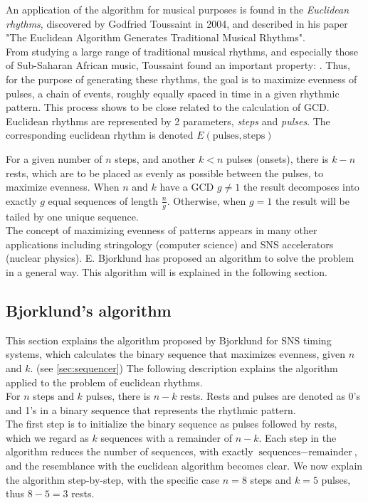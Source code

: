 An application of the algorithm for musical purposes is found in the \textit{Euclidean rhythms}, discovered by Godfried Toussaint in 2004, and described in his paper "The Euclidean Algorithm  Generates Traditional Musical Rhythms".\\
From studying a large range of traditional musical rhythms, and especially those of Sub-Saharan African music, Toussaint found an important property: \cite{Toussaint2005TheEA}. Thus, for the purpose of generating these rhythms, the goal is to maximize evenness of pulses, a chain of events, roughly equally spaced in time in a given rhythmic pattern.\cite{parncutt}
This process shows to be close related to the calculation of GCD.\\ 
Euclidean rhythms are represented by 2 parameters, \textit{steps} and \textit{pulses}. The corresponding euclidean rhythm is denoted $E(\text{pulses}, \text{steps})$

For a given number of $n$ steps, and another $k<n$ pulses (onsets), there is $k-n$ rests, which are to be placed as evenly as possible between the pulses, to maximize evenness. 
When $n$ and $k$ have a GCD $g \neq 1$ the result decomposes into exactly $g$ equal sequences of length $\frac{n}{g}$. Otherwise, when $g = 1$ the result will be tailed by one unique sequence.\\
The concept of maximizing evenness of patterns appears in many other applications including stringology (computer science) and SNS accelerators (nuclear physics)\cite{Toussaint2005TheEA}.
E. Bjorklund has proposed an algorithm to solve the problem in a general way\cite{bjorklund}\cite{Demaine2009TheDG}. This algorithm will is explained in the following section. 

\subsection{Bjorklund's algorithm}
\label{sec:bjorklund}
This section explains the algorithm proposed by Bjorklund for SNS timing systems, which calculates the binary sequence that maximizes evenness, given $n$ and $k$. (see \cref{sec:sequencer}) The following description explains the algorithm applied to the problem of euclidean rhythms.\\
For $n$ steps and $k$ pulses, there is $n-k$ rests. Rests and pulses are denoted as 0's and 1's in a binary sequence that represents the rhythmic pattern.\\
The first step is to initialize the binary sequence as pulses followed by rests, which we regard as $k$ sequences with a remainder of $n-k$.   
Each step in the algorithm reduces the number of sequences, with exactly $\text{sequences}-\text{remainder}$, and the resemblance with the euclidean algorithm becomes clear.
We now explain the algorithm step-by-step, with the specific case $n=8$ steps and $k=5$ pulses, thus $8-5 = 3$ rests.\\

